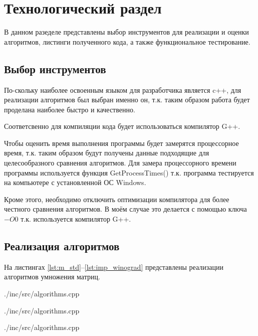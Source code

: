 \chapter{Технологический раздел}
В данном разеделе представлены выбор инструментов для реализации и оценки алгоритмов, листинги полученного кода, а также функциональное тестирование.

\section{Выбор инструментов}
По-скольку наиболее освоенным языком для разработчика является c++, для реализации алгоритмов был выбран именно он, т.к. таким образом работа будет проделана наиболее быстро и качественно.

Соответсвенно для компиляции кода будет использоваться компилятор G++.

Чтобы оценить время выполнения программы будет замерятся процессорное время, т.к. таким образом будут получены данные подходящие для целесообразного сравнения алгоритмов. Для замера процессорного времени программы используется функция GetProcessTimes() т.к. программа тестируется на компьютере с установленной ОС Windows. \cite{get_proccess_times}

Кроме этого, необходимо отключить оптимизации компилятора для более честного сравнения алгоритмов. В моём случае это делается с помощью ключа $-O0$ т.к. используется компилятор G++. \cite{optimization}

\section{Реализация алгоритмов}
На листингах \ref{lst:m_std}--\ref{lst:imp_winograd} представлены реализации алгоритмов умножения матриц.

\newpage
\begin{lstinputlisting}[
	caption={Классический алгоритм},
	label={lst:m_std},
	style={c},
	linerange={1-14},
	]{./inc/src/algorithms.cpp}
\end{lstinputlisting}

\begin{lstinputlisting}[
	caption={Алгоритм Винограда},
	label={lst:m_winograd},
	style={c},
	linerange={16-44},
	]{./inc/src/algorithms.cpp}
\end{lstinputlisting}

\newpage
\begin{lstinputlisting}[
	caption={Оптимизированный алгоритм Винограда},
	label={lst:imp_winograd},
	style={c},
	linerange={46-77},
	]{./inc/src/algorithms.cpp}
\end{lstinputlisting}

